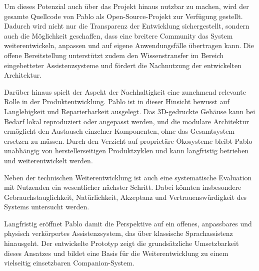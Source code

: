 Um dieses Potenzial auch über das Projekt hinaus nutzbar zu machen, wird der gesamte Quellcode von Pablo als Open-Source-Projekt zur Verfügung gestellt.
Dadurch wird nicht nur die Transparenz der Entwicklung sichergestellt, sondern auch die Möglichkeit geschaffen, dass eine breitere Community das System weiterentwickeln, anpassen und auf eigene Anwendungsfälle übertragen kann.
Die offene Bereitstellung unterstützt zudem den Wissenstransfer im Bereich eingebetteter Assistenzsysteme und fördert die Nachnutzung der entwickelten Architektur.

Darüber hinaus spielt der Aspekt der Nachhaltigkeit eine zunehmend relevante Rolle in der Produktentwicklung.
Pablo ist in dieser Hinsicht bewusst auf Langlebigkeit und Reparierbarkeit ausgelegt.
Das 3D-gedruckte Gehäuse kann bei Bedarf lokal reproduziert oder angepasst werden, und die modulare Architektur ermöglicht den Austausch einzelner Komponenten, ohne das Gesamtsystem ersetzen zu müssen.
Durch den Verzicht auf proprietäre Ökosysteme bleibt Pablo unabhängig von herstellerseitigen Produktzyklen und kann langfristig betrieben und weiterentwickelt werden.

Neben der technischen Weiterentwicklung ist auch eine systematische Evaluation mit Nutzenden ein wesentlicher nächster Schritt.
Dabei könnten insbesondere Gebrauchstauglichkeit, Natürlichkeit, Akzeptanz und Vertrauenswürdigkeit des Systems untersucht werden.

Langfristig eröffnet Pablo damit die Perspektive auf ein offenes, anpassbares und physisch verkörpertes Assistenzsystem, das über klassische Sprachassistenz hinausgeht.
Der entwickelte Prototyp zeigt die grundsätzliche Umsetzbarkeit dieses Ansatzes und bildet eine Basis für die Weiterentwicklung zu einem vielseitig einsetzbaren Companion-System.

